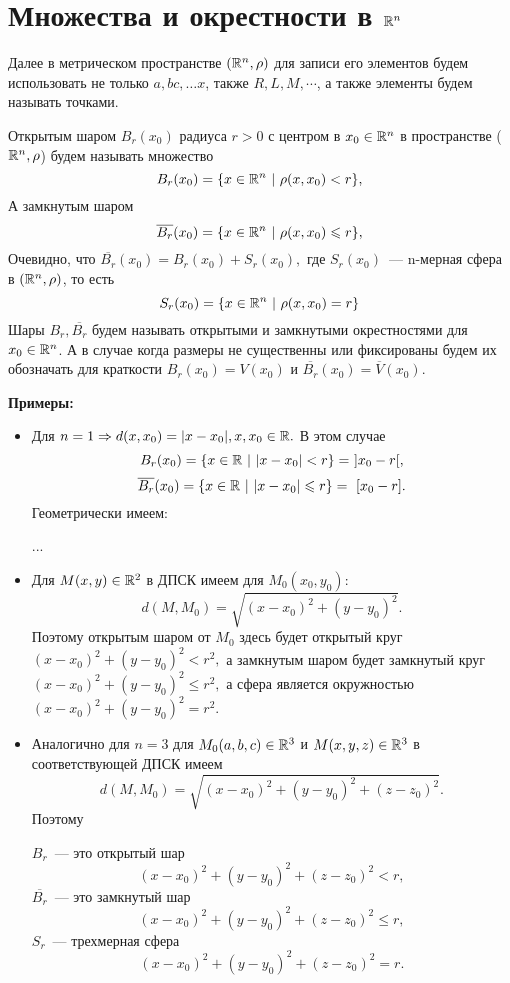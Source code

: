 \documentclass[../main.tex]{subfiles}
\begin{document}
	
	\section{Множества и окрестности в $\mathbb{R}^n$}
	Далее в метрическом пространстве $(\mathbb{R}^n, \rho)$ для записи его элементов будем использовать не только $a, b c, \dots x$, также $R, L, M, \cdots$, а также элементы будем называть точками.
	
	Открытым шаром $B_r(x_0)$ радиуса $r > 0$ с центром в $x_0 \in \mathbb{R}^n$ в пространстве ($\mathbb{R}^n, \rho$) будем называть множество 
	$$
	B_r(x_0) = \{x \in \R^n\ |\ \rho(x, x_0) < r\}, 
	$$
	А замкнутым шаром
	$$
	\overline{B_r}(x_0) = \{x \in \mathbb{R}^n\ |\ \rho(x, x_0) \leqslant r\}, 
	$$ 
	Очевидно, что $\overline{B_r}(x_0) = B_r(x_0) + S_r(x_0),$ где $ S_r(x_0)$~--- n-мерная сфера в  $(\mathbb{R}^n, \rho)$, то есть 
	$$
	S_r(x_0) = \{x \in \mathbb{R}^n\ |\ \rho(x, x_0) = r\}
	$$ 
	Шары $B_r, \overline{B_r}$ будем называть открытыми и замкнутыми окрестностями для $x_0 \in \mathbb{R}^n$. А в случае когда размеры не существенны или фиксированы будем их обозначать для краткости $B_r(x_0) = V(x_0)$ и $\overline{B_r}(x_0) = \overline{V}(x_0)$.
	
	\textbf{Примеры:}
	\begin{itemize}
	\item Для $n = 1 \Rightarrow d(x, x_0) = |x - x_0|, x, x_0 \in \mathbb{R}.$ В этом случае 
	$$
		B_r(x_0) = \{x \in \mathbb{R}\ |\ |x - x_0| < r\} =\ ] x_0 - r [,
	$$
	$$
		\overline{B_r}(x_0) = \{x \in \mathbb{R}\ |\ |x - x_0| \leqslant r\} =\ [ x_0 - r ].
	$$
	Геометрически имеем:
	
	...
	
	\item  Для $M(x, y) \in \mathbb{R}^2$ в ДПСК имеем для $M_0(x_0, y_0)$:
	$$
		d(M, M_0) = \sqrt{(x - x_0)^2 + (y - y_0)^2}.
	$$
	Поэтому открытым шаром от $M_0$ здесь будет открытый круг 
	$
		(x - x_0)^2 + (y - y_0)^2 < r^2,
	$ 
	а замкнутым шаром будет замкнутый круг 
	$
		(x - x_0)^2 + (y - y_0)^2 \leqslant r^2,
	$ 
	а сфера является окружностью 
	$
		(x - x_0)^2 + (y - y_0)^2 = r^2.
	$ 
	
	\item Аналогично для $n = 3$ для $M_0(a, b, c) \in \mathbb{R}^3$ и $M(x, y, z) \in \mathbb{R}^3$ в соответствующей ДПСК имеем  
	$$
		d(M, M_0) = \sqrt{(x - x_0)^2 + (y - y_0)^2 + (z - z_0)^2}.
	$$
	Поэтому
	
	$B_r$~--- это открытый шар
	$$
		(x - x_0)^2 + (y - y_0)^2 + (z - z_0)^2 < r,
	$$
	$\overline{B_r}$~--- это замкнутый шар
	$$
	(x - x_0)^2 + (y - y_0)^2 + (z - z_0)^2 \leqslant r,
	$$	
	$S_r$~--- трехмерная сфера
	$$
	(x - x_0)^2 + (y - y_0)^2 + (z - z_0)^2 = r.
	$$
	\end{itemize}
% 
% 
\end{document}

